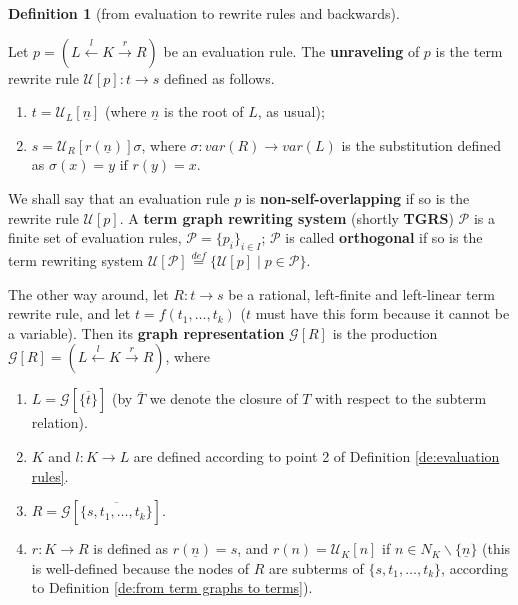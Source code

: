 \documentclass{eptcs}
\theoremstyle{plain}
\theoremstyle{definition}
\newtheorem{definition}[theorem]{Definition}
\newcommand{\varnodes}[1]{var(#1)}
\begin{document}
\begin{definition} 
[from evaluation to rewrite rules and backwards]
\label{de:evaluation to rewrite}

Let $p = (L \stackrel{l}{\leftarrow} K
\stackrel{r}{\rightarrow} R)$ be an evaluation rule. The {\bf 
unraveling} of $p$ is the term rewrite rule $\mathcal{U}[p]: t 
\rightarrow s$ defined as 
follows.
\begin{enumerate}

\item
$t = \mathcal{U}_L[\underline{n}]$ (where $\underline{n}$ is the 
root of $L$, as usual);

\item
$s = \mathcal{U}_R[r(\underline{n})]\sigma$, where $\sigma: 
\varnodes{R} \rightarrow \varnodes{L}$ is the substitution defined as
$  \sigma(x) = y \mbox{ \ \ if } r(y) = x$.
\end{enumerate}

\noindent 
We shall say that an evaluation rule $p$ is {\bf non-self-overlapping}
if so is the rewrite rule $\mathcal{U}[p]$. A {\bf term graph rewriting 
system} (shortly {\bf TGRS}) $\mathcal{P}$ is a finite set of evaluation 
rules, $\mathcal{P} = \{p_i\}_{i\in I}$; $\mathcal{P}$ is called {\bf 
orthogonal} if so is the term rewriting system $\mathcal{U}[\mathcal{P}] 
\stackrel{def}{=} \{\mathcal{U}[p] \mid p \in \mathcal{P}\}$. 

The other way around, let $R: t \rightarrow s$ be a rational,
left-finite and left-linear term rewrite rule, and let $t = f(t_1,
\ldots, t_k)$ ($t$ must have this form because it cannot be a
variable). Then its {\bf graph representation} $\mathcal{G}[R]$ is the
production $\mathcal{G}[R] = (L \stackrel{l}{\leftarrow} K
\stackrel{r}{\rightarrow} R)$, where

\begin{enumerate}
\item $L = \mathcal{G}[\overline{\{t\}}]$ (by $\overline{T}$ we denote 
the closure of $T$ with respect to the subterm relation).

\item $K$ and $l : K \rightarrow L$ are defined according to point 2 
of 
Definition \ref{de:evaluation rules}.

\item $R = \mathcal{G}[\overline{\{s, t_1, \ldots, t_k\}}]$.

\item $r: K \rightarrow R$ is defined as $r(\underline{n}) = s$, and 
$r(n) = \mathcal{U}_K[n]$ if $n \in N_K\backslash\{\underline{n}\}$ (this 
is 
well-defined because the nodes of $R$ are subterms of $\{s, t_1, 
\ldots,
 t_k\}$, according to Definition \ref{de:from term graphs to 
terms}).
\end{enumerate}
\end{definition}
\end{document}
